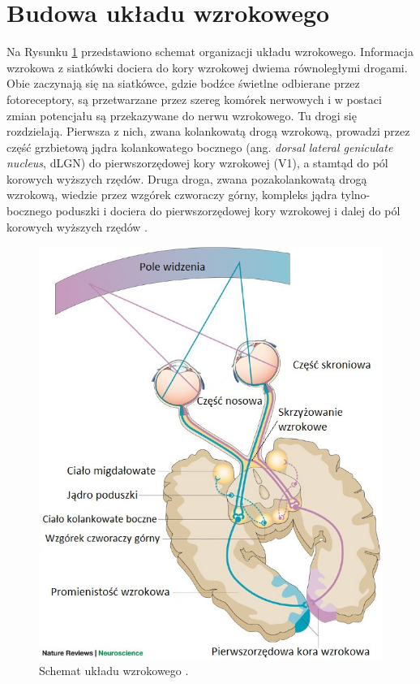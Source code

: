 \documentclass{pracamgr}
\begin{document}
	\section{Budowa układu wzrokowego}
	Na Rysunku \ref{rys:sch_u_wz} przedstawiono schemat organizacji układu wzrokowego. Informacja wzrokowa z siatkówki dociera do kory wzrokowej dwiema równoległymi drogami. Obie zaczynają się na siatkówce, gdzie bodźce świetlne odbierane przez fotoreceptory, są przetwarzane przez szereg komórek nerwowych i w postaci zmian potencjału są przekazywane do nerwu wzrokowego. Tu drogi się rozdzielają. Pierwsza z nich, zwana kolankowatą drogą wzrokową, prowadzi przez część grzbietową jądra kolankowatego bocznego (ang. \textit{dorsal lateral geniculate nucleus}, dLGN)  do pierwszorzędowej kory wzrokowej (V1), a stamtąd do pól korowych wyższych rzędów. Druga droga, zwana pozakolankowatą drogą wzrokową, wiedzie przez wzgórek czworaczy górny, kompleks jądra tylno-bocznego poduszki i dociera do pierwszorzędowej kory wzrokowej i dalej do pól korowych wyższych rzędów \citep{viola}. 
	\begin{figure}[htbp]
		\begin{center}
			\includegraphics[scale=0.5]{schemat_ukladu.jpg}
		\end{center}
		\caption{Schemat układu wzrokowego \citep{hannula}.}
		\label{rys:sch_u_wz}
	\end{figure}
\end{document}
